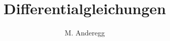 \documentclass[a4paper, 11pt]{article}
\begin{document}
\title{Differentialgleichungen}
\author{M. Anderegg}
\date{} %
\maketitle



\clearpage

\clearpage

\clearpage

\end{document}
